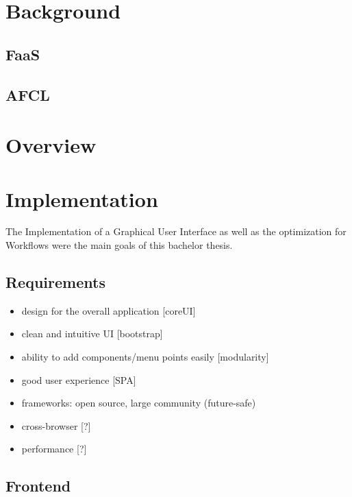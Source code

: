 \documentclass[a4paper,11pt,pdftex,halfparskip,cleardoubleempty]{scrbook}
\begin{document}
\section{Background}

\subsection{FaaS}
\subsection{AFCL}

\section{Overview}

\section{Implementation}
The Implementation of a Graphical User Interface as well as the optimization for Workflows were the main goals of this bachelor thesis. 

\subsection{Requirements}

\begin{itemize}
	\item design for the overall application [coreUI]
	\item clean and intuitive UI [bootstrap]
	\item ability to add components/menu points easily [modularity]
	\item good user experience [SPA]
	\item frameworks: open source, large community (future-safe)
	\item cross-browser [?]
	\item performance [?]
\end{itemize}

\subsection{Frontend}
\end{document}

